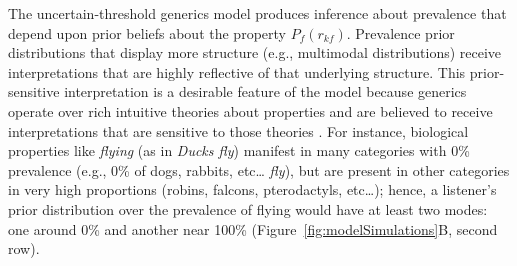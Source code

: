 \documentclass[floatsintext,doc]{apa6}
\let\rmarkdownfootnote\footnote%
\def\footnote{\protect\rmarkdownfootnote}
\begin{document}



 
 The uncertain-threshold generics model produces inference about prevalence that depend upon prior beliefs about the property $P_f(r_{kf})$. 
 Prevalence prior distributions that display more structure (e.g., multimodal distributions) receive interpretations that are highly reflective of that underlying structure.
 This prior-sensitive interpretation is a desirable feature of the model because generics operate over rich intuitive theories about properties and are believed to receive interpretations that are sensitive to those theories \cite{Leslie2007, Gelman2010:essentialist, Cimpian2010theory, Rhodes2012, Prasada2013}. 
 For instance, biological properties like \emph{flying} (as in \emph{Ducks fly}) manifest in many categories with 0\% prevalence (e.g., 0\% of dogs, rabbits, etc\ldots{} \emph{fly}), but are present in other categories in very high proportions (robins, falcons, pterodactyls, etc\ldots{}); hence, a listener's prior distribution over the prevalence of flying would have at least two modes: one around 0\% and another near 100\% (Figure~\ref{fig:modelSimulations}B, second row).
\end{document}
